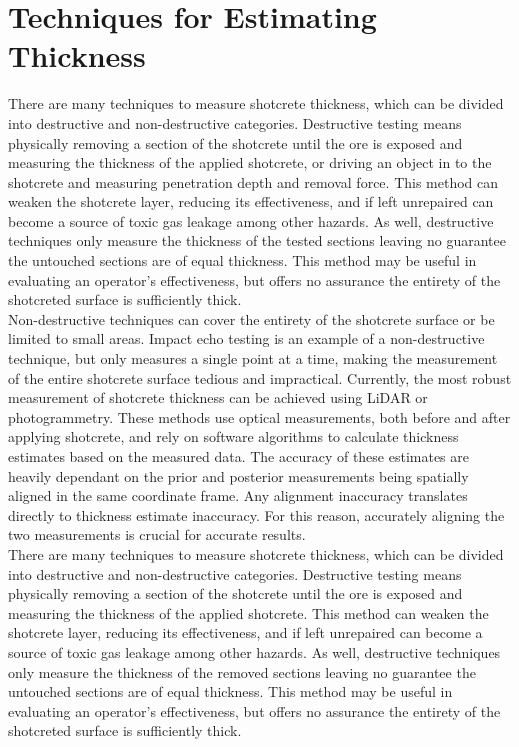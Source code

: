 \section{Techniques for Estimating Thickness}

There are many techniques to measure shotcrete thickness, which can be divided into destructive and non-destructive categories. Destructive testing means physically removing a section of the shotcrete until the ore is exposed and measuring the thickness of the applied shotcrete, or driving an object in to the shotcrete and measuring penetration depth and removal force. This method can weaken the shotcrete layer, reducing its effectiveness, and if left unrepaired can become a source of toxic gas leakage among other hazards. As well, destructive techniques only measure the thickness of the tested sections leaving no guarantee the untouched sections are of equal thickness. This method may be useful in evaluating an operator's effectiveness, but offers no assurance the entirety of the shotcreted surface is sufficiently thick.\\

Non-destructive techniques can cover the entirety of the shotcrete surface or be limited to small areas. Impact echo testing is an example of a non-destructive technique\cite{impact}, but only measures a single point at a time, making the measurement of the entire shotcrete surface tedious and impractical. Currently, the most robust measurement of shotcrete thickness can be achieved using LiDAR or photogrammetry. These methods use optical measurements, both before and after applying shotcrete, and rely on software algorithms to calculate thickness estimates based on the measured data. The accuracy of these estimates are heavily dependant on the prior and posterior measurements being spatially aligned in the same coordinate frame. Any alignment inaccuracy translates directly to thickness estimate inaccuracy. For this reason, accurately aligning the two measurements is crucial for accurate results.\\

There are many techniques to measure shotcrete thickness, which can be divided into destructive and non-destructive categories. Destructive testing means physically removing a section of the shotcrete until the ore is exposed and measuring the thickness of the applied shotcrete. This method can weaken the shotcrete layer, reducing its effectiveness, and if left unrepaired can become a source of toxic gas leakage among other hazards. As well, destructive techniques only measure the thickness of the removed sections leaving no guarantee the untouched sections are of equal thickness. This method may be useful in evaluating an operator's effectiveness, but offers no assurance the entirety of the shotcreted surface is sufficiently thick.\\


